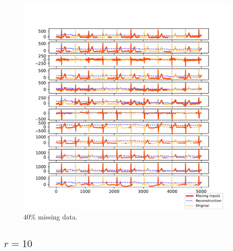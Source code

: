 \documentclass{mldsmsc}
\begin{document}
\begin{figure}[H]
\vspace{1em} %

\begin{minipage}{0.4\linewidth}
    \centering
    \includegraphics[width=\linewidth]{images/missing/mlesmf_output_40_3.pdf}
    \caption{$40\%$ missing data.}
\end{minipage}
\end{figure}

\subsection{$r = 10$}
\end{document}
